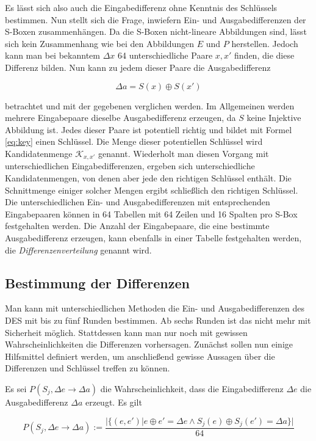 \documentclass[
10pt, %
a4paper, %
oneside, %
headinclude,footinclude, %
BCOR5mm, %
]{scrartcl}
\begin{document}
\begin{1}[ht]
	Es lässt sich also auch die Eingabedifferenz ohne Kenntnis des Schlüssels bestimmen. \cite[139]{3} Nun stellt sich die Frage, inwiefern Ein- und Ausgabedifferenzen der S-Boxen zusammenhängen. Da die S-Boxen nicht-lineare Abbildungen sind, lässt sich kein Zusammenhang wie bei den Abbildungen $E$ und $P$ herstellen. Jedoch kann man bei bekanntem $\Delta x$ 64 unterschiedliche Paare $x,x'$ finden, die diese Differenz bilden. Nun kann zu jedem dieser Paare die Ausgabedifferenz

	$$ \Delta a = S(x) \oplus S(x') $$

	betrachtet und mit der gegebenen verglichen werden. Im Allgemeinen werden mehrere Eingabepaare dieselbe Ausgabedifferenz erzeugen, da $S$ keine Injektive Abbildung ist. \cite[155-156]{3} Jedes dieser Paare ist potentiell richtig und bildet mit Formel \ref{eq:key} einen Schlüssel. Die Menge dieser potentiellen Schlüssel wird Kandidatenmenge $\mathcal{K}_{x,x'}$ genannt. Wiederholt man diesen Vorgang mit unterschiedlichen Eingabedifferenzen, ergeben sich unterschiedliche Kandidatenmengen, von denen aber jede den richtigen Schlüssel enthält. Die Schnittmenge einiger solcher Mengen ergibt schließlich den richtigen Schlüssel. \cite[160]{3} \\
	Die unterschiedlichen Ein- und Ausgabedifferenzen mit entsprechenden Eingabepaaren können in 64 Tabellen mit 64 Zeilen und 16 Spalten pro S-Box festgehalten werden. Die Anzahl der Eingabepaare, die eine bestimmte Ausgabedifferenz erzeugen, kann ebenfalls in einer Tabelle festgehalten werden, die \emph{Differenzenverteilung} genannt wird. \cite[156]{3}

	\subsection{Bestimmung der Differenzen}
	Man kann mit unterschiedlichen Methoden die Ein- und Ausgabedifferenzen des DES mit bis zu fünf Runden bestimmen. Ab sechs Runden ist das nicht mehr mit Sicherheit möglich. Stattdessen kann man nur noch mit gewissen Wahrscheinlichkeiten die Differenzen vorhersagen. Zunächst sollen nun einige Hilfsmittel definiert werden, um anschließend gewisse Aussagen über die Differenzen und Schlüssel treffen zu können.

	\begin{definition}
	Es sei $P(S_j, \Delta e \rightarrow \Delta a)$ die Wahrscheinlichkeit, dass die Eingabedifferenz $\Delta e$ die Ausgabedifferenz $\Delta a$ erzeugt. Es gilt

	$$ P(S_j, \Delta e \rightarrow \Delta a) :=
		\frac{| \{(e,e') | e \oplus e' = \Delta e 
		\wedge S_j(e) \oplus S_j(e') = \Delta a\} |}{64} $$


\end{definition}
\end{1}
\end{document}
